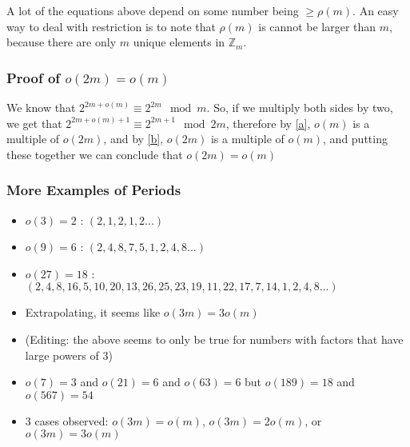 \documentclass{article}
\begin{document}
  A lot of the equations above depend on some number being $\geq \rho(m)$. An easy way to deal with restriction is to note that $\rho(m)$ is cannot be larger than $m$, because there are only $m$ unique elements in $\mathbb{Z}_m$. 
  \subsubsection{Proof of $o(2m) = o(m)$}
  We know that $2^{2m+o(m)} \equiv 2^{2m} \mod m$. So, if we multiply both sides by two, we get that $2^{2m + o(m) + 1}\equiv 2^{2m+1} \mod 2m$, therefore by \eqref{a}, $o(m)$ is a multiple of $o(2m)$, and by \eqref{b}, $o(2m)$ is a multiple of $o(m)$, and putting these together we can conclude that $o(2m) = o(m)$  
  \subsubsection{More Examples of Periods}
  \begin{itemize}
  \item $o(3) = 2$ : $(2, 1, 2, 1, 2 ...)$
  \item $o(9) = 6$ : $(2, 4, 8, 7, 5, 1, 2, 4, 8 ...)$
  \item $o(27) = 18$ : $(2, 4, 8, 16, 5, 10, 20, 13, 26, 25, 23, 19, 11, 22, 17, 7, 14, 1, 2, 4, 8 ...)$
  \item Extrapolating, it seems like $o(3m) = 3o(m)$
  \item (Editing: the above seems to only be true for numbers with factors that have large powers of 3)
  \item $o(7) = 3$ and $o(21) = 6$ and $o(63) = 6$ but $o(189) = 18$ and $o(567) = 54$
  \item 3 cases observed: $o(3m) = o(m)$, $o(3m) = 2o(m)$, or $o(3m) = 3o(m)$
  \end{itemize}
\end{document}
